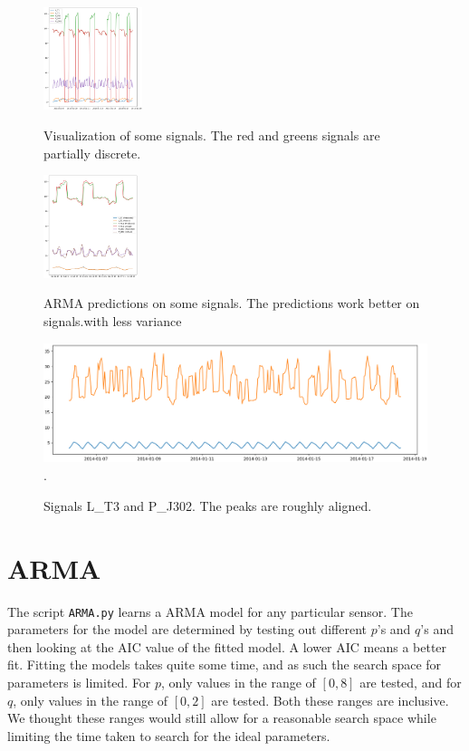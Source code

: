 \documentclass[]{article}
\begin{document}
\begin{figure}[H]
\begin{minipage}{.5\textwidth}
  \includegraphics[width=0.8\linewidth, height=3cm]{./visuallizations/signals.png}
  \caption{Visualization of some signals. The red and greens signals are partially discrete.}
  \label{signals}
\end{minipage} %
\begin{minipage}{.5\textwidth}
  \includegraphics[width=0.8\linewidth, height=3cm]{./visuallizations/predictions.png}
   \caption{ARMA predictions on some signals. The predictions work better on signals.with less variance}
  \label{predictions}
\end{minipage}
\begin{minipage}{.5\textwidth}
  \includegraphics[width=2\linewidth, height=3.5cm]{./visuallizations/correlated_signals.png}.
  \label{correlation}
  \caption{Signals L\_T3 and P\_J302. The peaks are roughly aligned.}
\end{minipage}%
\end{figure}
\clearpage
\section{ARMA}
The script \texttt{ARMA.py} learns a ARMA model for any particular sensor. The parameters for the model are determined by testing out different $p$'s and $q$'s and then looking at the AIC value of the fitted model. A lower AIC means a better fit. Fitting the models takes quite some time, and as such the search space for parameters is limited. For $p$, only values in the range of $[0, 8]$ are tested, and for $q$, only values in the range of $[0, 2]$ are tested. Both these ranges are inclusive. We thought these ranges would still allow for a reasonable search space while limiting the time taken to search for the ideal parameters.
\end{document}
